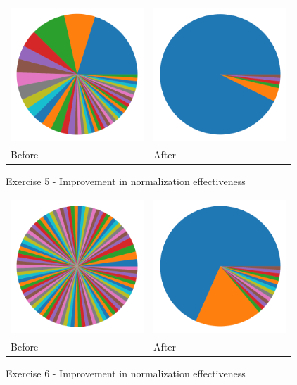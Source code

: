 \begin{figure}
\centering
\begin{tabular}{ >{\centering\arraybackslash}m{14em} >{\centering\arraybackslash}m{14em} }
\includegraphics[height=5cm]{graphs/cluster-baseline-5.png}
&
\includegraphics[height=5cm]{graphs/cluster-aggressive-5.png} \\
Before & After
\end{tabular}
\caption{Exercise 5 - Improvement in normalization effectiveness}
\label{fig:improvements-clusters-5}
\end{figure}

\begin{figure}
\centering
\begin{tabular}{ >{\centering\arraybackslash}m{14em} >{\centering\arraybackslash}m{14em} }
\includegraphics[height=5cm]{graphs/cluster-baseline-6.png}
&
\includegraphics[height=5cm]{graphs/cluster-aggressive-6.png} \\
Before & After
\end{tabular}
\caption{Exercise 6 - Improvement in normalization effectiveness}
\label{fig:improvements-clusters-6}
\end{figure}

